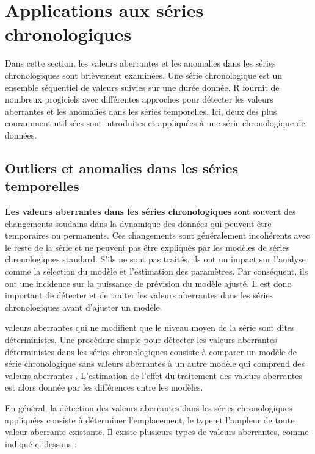 \newpage\section{Applications aux séries chronologiques} \label{Section:5}
Dans cette section, les valeurs aberrantes et les anomalies dans les séries chronologiques sont brièvement examinées. Une série chronologique est un ensemble séquentiel de valeurs suivies sur une durée donnée. R fournit de nombreux progiciels avec différentes approches pour détecter les valeurs aberrantes et les anomalies dans les séries temporelles. Ici, deux des plus couramment utilisées sont introduites et appliquées à une série chronologique de données. \subsection{Outliers et anomalies dans les séries temporelles} \textbf{Les valeurs aberrantes dans les séries chronologiques} sont souvent des changements soudains dans la dynamique des données qui peuvent être temporaires ou permanents. Ces changements sont généralement incohérents avec le reste de la série et ne peuvent pas être expliqués par les modèles de séries chronologiques standard. S'ils ne sont pas traités, ils ont un impact sur l'analyse comme la sélection du modèle et l'estimation des paramètres. Par conséquent, ils ont une incidence sur la puissance de prévision du modèle ajusté. Il est donc important de détecter et de traiter les valeurs aberrantes dans les séries chronologiques avant d'ajuster un modèle. \par valeurs aberrantes qui ne modifient que le niveau moyen de la série sont dites déterministes. Une procédure simple pour détecter les valeurs aberrantes déterministes dans les séries chronologiques consiste à comparer un modèle de série chronologique sans valeurs aberrantes à un autre modèle qui comprend des valeurs aberrantes \cite{tsay}. L'estimation de l'effet du traitement des valeurs aberrantes est alors donnée par les différences entre les modèles. \par En général, la détection des valeurs aberrantes dans les séries chronologiques appliquées consiste à déterminer l'emplacement, le type et l'ampleur de toute valeur aberrante existante. Il existe plusieurs types de valeurs aberrantes, comme indiqué ci-dessous : 
